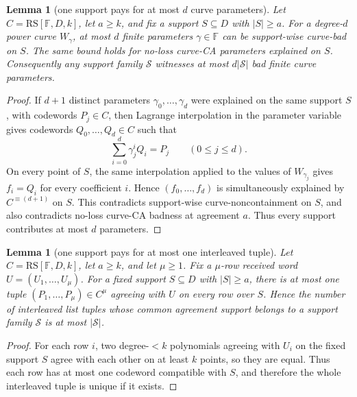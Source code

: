 \documentclass[11pt]{article}
\newtheorem{lemma}[theorem]{Lemma}
\theoremstyle{definition}
\theoremstyle{remark}
\newcommand{\F}{\mathbb{F}}
\newcommand{\RS}{\mathrm{RS}}
\begin{document}
\begin{lemma}[one support pays for at most $d$ curve parameters]
\label{lem:one-support-d-curve}
Let $C=\RS[\F,D,k]$, let $a\ge k$, and fix a support $S\subseteq D$ with
$|S|\ge a$.  For a degree-$d$ power curve $W_\gamma$, at most $d$ finite
parameters $\gamma\in\F$ can be support-wise curve-bad on $S$.  The same bound
holds for no-loss curve-CA parameters explained on $S$.  Consequently any
support family $\mathcal S$ witnesses at most $d|\mathcal S|$ bad finite curve
parameters.
\end{lemma}

\begin{proof}
If $d+1$ distinct parameters $\gamma_0,\ldots,\gamma_d$ were explained on the
same support $S$, with codewords $P_j\in C$, then Lagrange interpolation in the
parameter variable gives codewords $Q_0,\ldots,Q_d\in C$ such that
\[
        \sum_{i=0}^d \gamma_j^i Q_i=P_j
        \qquad (0\le j\le d).
\]
On every point of $S$, the same interpolation applied to the values of
$W_{\gamma_j}$ gives $f_i=Q_i$ for every coefficient $i$.  Hence
$(f_0,\ldots,f_d)$ is simultaneously explained by $C^{\equiv(d+1)}$ on $S$.
This contradicts support-wise curve-noncontainment on $S$, and also contradicts
no-loss curve-CA badness at agreement $a$.  Thus every support contributes at
most $d$ parameters.
\end{proof}

\begin{lemma}[one support pays for at most one interleaved tuple]
\label{lem:one-support-one-interleaved}
Let $C=\RS[\F,D,k]$, let $a\ge k$, and let $\mu\ge1$.  Fix a $\mu$-row received
word $U=(U_1,\ldots,U_\mu)$.  For a fixed support $S\subseteq D$ with
$|S|\ge a$, there is at most one tuple $(P_1,\ldots,P_\mu)\in C^\mu$ agreeing
with $U$ on every row over $S$.  Hence the number of interleaved list tuples whose
common agreement support belongs to a support family $\mathcal S$ is at most
$|\mathcal S|$.
\end{lemma}

\begin{proof}
For each row $i$, two degree-$<k$ polynomials agreeing with $U_i$ on the fixed
support $S$ agree with each other on at least $k$ points, so they are equal.  Thus
each row has at most one codeword compatible with $S$, and therefore the whole
interleaved tuple is unique if it exists.
\end{proof}
\end{document}

